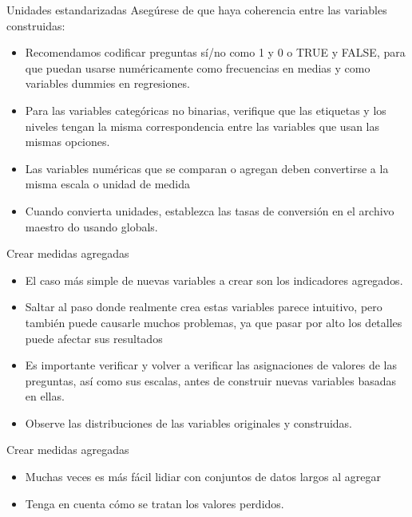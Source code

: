 \documentclass[10pt, aspectratio=169, compress]{beamer}
\begin{document}
\begin{frame}[<+->]{Unidades estandarizadas}
	Asegúrese de que haya coherencia entre las variables construidas:
	\begin{itemize}
		\item Recomendamos codificar preguntas sí/no como 1 y 0 o TRUE y FALSE, para que puedan usarse numéricamente como frecuencias en medias y como variables dummies en regresiones.
		\item Para las variables categóricas no binarias, verifique que las etiquetas y los niveles tengan la misma correspondencia entre las variables que usan las mismas opciones.
		\item Las variables numéricas que se comparan o agregan deben convertirse a la misma escala o unidad de medida
		\item Cuando convierta unidades, establezca las tasas de conversión en el archivo maestro do usando globals.
	\end{itemize}
\end{frame}
\begin{frame}[<+->]{Crear medidas agregadas}
	\begin{itemize}
		\item El caso más simple de nuevas variables a crear son los indicadores agregados.
		\item Saltar al paso donde realmente crea estas variables parece intuitivo, pero también puede causarle muchos problemas, ya que pasar por alto los detalles puede afectar sus resultados
		\item Es importante verificar y volver a verificar las asignaciones de valores de las preguntas, así como sus escalas, antes de construir nuevas variables basadas en ellas.
		\item Observe las distribuciones de las variables originales y construidas.
	\end{itemize}
\end{frame}
\begin{frame}{Crear medidas agregadas}
	\begin{itemize}
		\item Muchas veces es más fácil lidiar con conjuntos de datos largos al agregar
		\item Tenga en cuenta cómo se tratan los valores perdidos.
	\end{itemize}
\end{frame}
\end{document}
